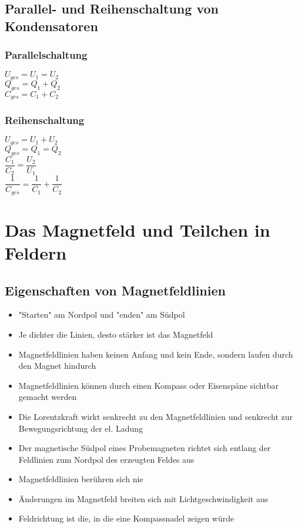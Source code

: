 \documentclass[12pt]{scrartcl}
\begin{document}
\begin{flushleft}
		\subsection{Parallel- und Reihenschaltung von Kondensatoren}
			\subsubsection{Parallelschaltung}
			$U_{ges} = U_{1} = U_{2}$
			\vspace{2mm} \\
			$Q_{ges} = Q_{1} + Q_{2}$
			\vspace{2mm} \\
			$C_{ges} = C_{1} + C_{2}$
			
			\subsubsection{Reihenschaltung} 
			$U_{ges} = U_{1} + U_{2}$
			\vspace{2mm} \\
			$Q_{ges} = Q_{1} = Q_{2}$
			\vspace{3mm} \\
			$\dfrac{C_{1}}{C_{2}} = \dfrac{U_{2}}{U_{1}}$
			\vspace{3mm} \\
			$\dfrac{1}{C_{ges}} = \dfrac{1}{C_{1}} + \dfrac{1}{C_{2}}$	
			
			\newpage
	\section{Das Magnetfeld und Teilchen in Feldern}
		\subsection{Eigenschaften von Magnetfeldlinien}
		\begin{itemize}
			\item "Starten" am Nordpol und "enden" am Südpol
			\item Je dichter die Linien, desto stärker ist das Magnetfeld
			\item Magnetfeldlinien haben keinen Anfang und kein Ende, sondern laufen durch den Magnet hindurch
			\item Magnetfeldlinien können durch einen Kompass oder Eisenspäne sichtbar gemacht werden
			\item Die Lorentzkraft wirkt senkrecht zu den Magnetfeldlinien und senkrecht zur Bewegungsrichtung der el. Ladung
			\item Der magnetische Südpol eines Probemagneten richtet sich entlang der Feldlinien zum Nordpol des erzeugten Feldes aus
			\item Magnetfeldlinien berühren sich nie
			\item Änderungen im Magnetfeld breiten sich mit Lichtgeschwindigkeit aus
			\item Feldrichtung ist die, in die eine Kompassnadel zeigen würde
		\end{itemize}
		

\end{flushleft}
\end{document}
